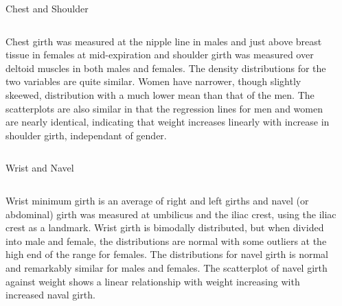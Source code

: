 \documentclass[table]{beamer}
\begin{document}

\begin{frame}{Chest and Shoulder}
     \begin{columns}[t] %
     \begin{column}[T]{5cm} %
   
{\fontsize{0.275cm}{1em}\selectfont 
Chest girth was measured at the nipple line in males and just above breast tissue in females at mid-expiration and shoulder girth was measured over deltoid muscles in both males and females. The density distributions for the two variables are quite similar. Women have narrower, though slightly skeewed, distribution with a much lower mean than that of the men. The scatterplots are also similar in that the regression lines for men and women are nearly identical, indicating that weight increases linearly with increase in shoulder girth, independant of gender.}

\end{column}
\begin{column}[T]{7cm} %



     \end{column}
     \end{columns}
\end{frame}


\begin{frame}{Wrist and Navel}
     \begin{columns}[t] %
     \begin{column}[T]{5cm} %
   
{\fontsize{0.275cm}{1em}\selectfont 
Wrist minimum girth is an average of right and left girths and navel (or abdominal) girth was measured at umbilicus and the iliac crest, using the iliac crest as a landmark. Wrist girth is bimodally distributed, but when divided into male and female, the distributions are normal with some outliers at the high end of the range for females. The distributions for navel girth is normal and remarkably similar for males and females. The scatterplot of navel girth against weight shows a linear relationship with weight increasing with increased naval girth.}

\end{column}
\begin{column}[T]{6cm} %



     \end{column}
     \end{columns}
\end{frame}
\end{document}
